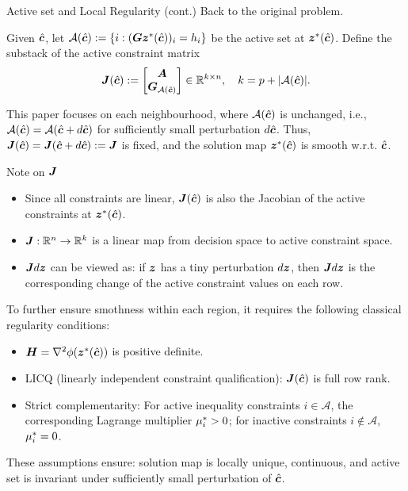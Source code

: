 \documentclass[10pt,aspectratio=169,xcolor=dvipsnames]{beamer}
\begin{document}
\begin{frame}[allowframebreaks]{Active set and Local Regularity (cont.)}
    Back to the original problem.

    \vspace{1em}

     Given $\hat{{\bm{c}}}$, let $\mathcal{A}(\hat{{\bm{c}}}) := \{i: ({\bm{G}} {\bm{z}}^*(\hat{{\bm{c}}}))_i = {h}_i\}$ be the active set at ${\bm{z}}^*(\hat{{\bm{c}}})$. Define the substack of the active constraint matrix
    $$
    {\bm{J}}(\hat{{\bm{c}}}) := \begin{bmatrix}
        {\bm{A}}\\
        {\bm{G}}_{\mathcal{A}(\hat{{\bm{c}}})}
    \end{bmatrix} \in \mathbb{R}^{k\times n},\quad k = p + |\mathcal{A}(\hat{{\bm{c}}})|.
    $$


    This paper focuses on each neighbourhood, where $\mathcal{A}(\hat{{\bm{c}}})$ is unchanged, i.e., $\mathcal{A}(\hat{{\bm{c}}}) = \mathcal{A}(\hat{{\bm{c}}} + d\hat{{\bm{c}}})$ for sufficiently small perturbation $d\hat{{\bm{c}}}$. Thus, ${\bm{J}}(\hat{{\bm{c}}}) = {\bm{J}}(\hat{{\bm{c}}} + d\hat{{\bm{c}}}) := {\bm{J}}$ is fixed, and the solution map ${\bm{z}}^*(\hat{{\bm{c}}})$ is smooth w.r.t. $\hat{{\bm{c}}}$.


    \begin{block}{\small Note on ${\bm{J}}$}
        \begin{itemize}
            \item Since all constraints are linear, ${\bm{J}}(\hat{{\bm{c}}})$ is also the Jacobian of the active constraints at ${\bm{z}}^*(\hat{{\bm{c}}})$.
            \item ${\bm{J}}: \mathbb{R}^n \to \mathbb{R}^k$ is a linear map from decision space to active constraint space.
            \item ${\bm{J}} d{\bm{z}}$ can be viewed as: if ${\bm{z}}$ has a tiny perturbation $d{\bm{z}}$, then ${\bm{J}} d{\bm{z}}$ is the corresponding change of the active constraint values on each row.
        \end{itemize}
    \end{block}

    \break

    To further ensure smothness within each region, it requires the following classical regularity conditions:
    \begin{itemize}
        \item ${\bm{H}} = \nabla^2 \phi({\bm{z}}^*(\hat{{\bm{c}}}))$ is positive definite.
        \item LICQ (linearly independent constraint qualification): ${\bm{J}}(\hat{{\bm{c}}})$ is full row rank.
        \item Strict complementarity: For active inequality constraints $i \in \mathcal{A}$, the corresponding Lagrange multiplier ${\mu}_i^* > 0$; for inactive constraints $i \notin \mathcal{A}$, ${\mu}_i^* = 0$.
    \end{itemize}
    These assumptions ensure: solution map is locally unique, continuous, and active set is invariant under sufficiently small perturbation of $\hat{{\bm{c}}}$.

\end{frame}
\end{document}
